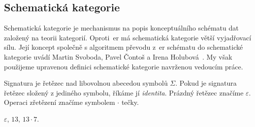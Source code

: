 \subsection{Schematická kategorie}

Schematická kategorie je mechanismus na popis konceptuálního schématu dat založený na teorii kategorií.
Oproti~\acrshort{er} má schematická kategorie větší vyjadřovací sílu.
Její koncept společně s algoritmem převodu z~\acrshort{er} schématu do schematické kategorie uvádí Martin Svoboda, Pavel Čontoš a Irena Holubová~\cite{svoboda_categorical_2021}.
My však použijeme upravenou definici schematické kategorie navrženou vedoucím práce.

\begin{definition}[Signatura]\label{def:signature}
  Signatura je řetězec nad libovolnou abecedou symbolů $\Sigma$.
  Pokud je signatura řetězec složený z jediného symbolu, říkáme jí \emph{identita}.
  Prázdný řetězec značíme $\varepsilon$.
  Operaci zřetězení značíme symbolem $\cdot$ tečky.
\end{definition}

\begin{example}
  $\varepsilon$, $13$, $13\cdot 7$.
\end{example}

